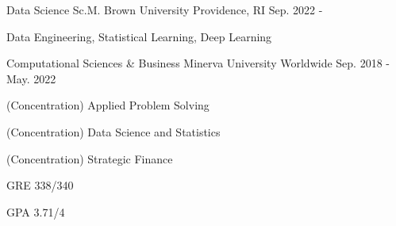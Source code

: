 \begin{cventries}
  \cventry
    {Data Science Sc.M.}
    {Brown University}
    {Providence, RI}
    {Sep. 2022 -}
    {
    \begin{cvitems}
        \item {Data Engineering, Statistical Learning, Deep Learning}
    \end{cvitems}
    }

  \cventry
    {Computational Sciences \& Business}
    {Minerva University}
    {Worldwide}
    {Sep. 2018 - May. 2022}
    {
      \begin{cvitems}
        \item {(Concentration) Applied Problem Solving}
        \item {(Concentration) Data Science and Statistics}
        \item {(Concentration) Strategic Finance}
        \item {GRE 338/340}
        \item {GPA 3.71/4}
      \end{cvitems}
    }
\end{cventries}
